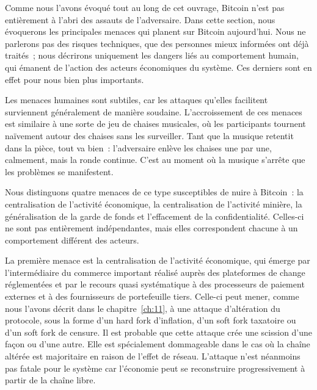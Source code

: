 Comme nous l'avons évoqué tout au long de cet ouvrage, Bitcoin n'est pas entièrement à l'abri des assauts de l'adversaire. Dans cette section, nous évoquerons les principales menaces qui planent sur Bitcoin aujourd'hui. Nous ne parlerons pas des risques techniques, que des personnes mieux informées ont déjà traités~; nous décrirons uniquement les dangers liés au comportement humain, qui émanent de l'action des acteurs économiques du système. Ces derniers sont en effet pour nous bien plus importants.

Les menaces humaines sont subtiles, car les attaques qu'elles facilitent surviennent généralement de manière soudaine. L'accroissement de ces menaces est similaire à une sorte de jeu de chaises musicales, où les participants tournent naïvement autour des chaises sans les surveiller. Tant que la musique retentit dans la pièce, tout va bien~: l'adversaire enlève les chaises une par une, calmement, mais la ronde continue. C'est au moment où la musique s'arrête que les problèmes se manifestent.

Nous distinguons quatre menaces de ce type susceptibles de nuire à Bitcoin~: la centralisation de l'activité économique, la centralisation de l'activité minière, la généralisation de la garde de fonds et l'effacement de la confidentialité. Celles-ci ne sont pas entièrement indépendantes, mais elles correspondent chacune à un comportement différent des acteurs.

La première menace est la centralisation de l'activité économique, qui émerge par l'intermédiaire du commerce important réalisé auprès des plateformes de change réglementées et par le recours quasi systématique à des processeurs de paiement externes et à des fournisseurs de portefeuille tiers. Celle-ci peut mener, comme nous l'avons décrit dans le chapitre~\ref{ch:11}, à une attaque d'altération du protocole, sous la forme d'un hard fork d'inflation, d'un soft fork taxatoire ou d'un soft fork de censure. Il est probable que cette attaque crée une scission d'une façon ou d'une autre. Elle est spécialement dommageable dans le cas où la chaîne altérée est majoritaire en raison de l'effet de réseau. L'attaque n'est néanmoins pas fatale pour le système car l'économie peut se reconstruire progressivement à partir de la chaîne libre.

